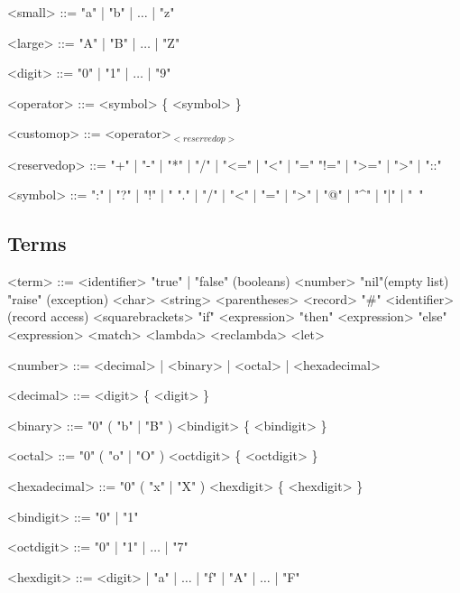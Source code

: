 \documentclass{article}
\begin{document}
\begin{grammar}
  <small> ::= "a" | "b" | $\ldots$ | "z"

  <large> ::= "A" | "B" | $\ldots$ | "Z"

  <digit> ::= "0" | "1" | $\ldots$ | "9"
\end{grammar}

\begin{grammar}
  <operator> ::= <symbol> \{ <symbol> \}

  <customop> ::= <operator>$_{<reservedop>}$

  <reservedop> ::= "+" | "-" | "*" | "/" | "<=" | "<" | "="
  \alt "!=" | ">=" | ">" | "::"

  <symbol> ::= ":" | "?" | "!" | "%
  \alt "." | "/" | "<" | "=" | ">" | "@" | "^" | "|" | "~"
\end{grammar}

\newpage

\subsection{Terms}

\begin{grammar}
  <term> ::= <identifier>
  \alt "true" | "false" \hfill (booleans)
  \alt <number>
  \alt "nil"\hfill (empty list)
  \alt "raise" \hfill (exception)
  \alt <char>
  \alt <string>
  \alt <parentheses>
  \alt <record>
  \alt "#" <identifier> \hfill (record access)
  \alt <squarebrackets>
  \alt "if" \textvisiblespace <expression> "then" \textvisiblespace <expression> "else" \textvisiblespace <expression>
  \alt <match>
  \alt <lambda>
  \alt <reclambda>
  \alt <let>
\end{grammar}

\begin{grammar}
  <number> ::= <decimal> | <binary> | <octal> | <hexadecimal>

  <decimal> ::= <digit> \{ <digit> \}

  <binary> ::= "0" ( "b" | "B" ) <bindigit> \{ <bindigit> \}

  <octal> ::= "0" ( "o" | "O" ) <octdigit> \{ <octdigit> \}

  <hexadecimal> ::= "0" ( "x" | "X" ) <hexdigit> \{ <hexdigit> \}

  <bindigit> ::= "0" | "1"

  <octdigit> ::= "0" | "1" | $\ldots$ | "7"

  <hexdigit> ::= <digit> | "a" | $\ldots$ | "f" | "A" | $\ldots$ | "F"
\end{grammar}
\end{document}
